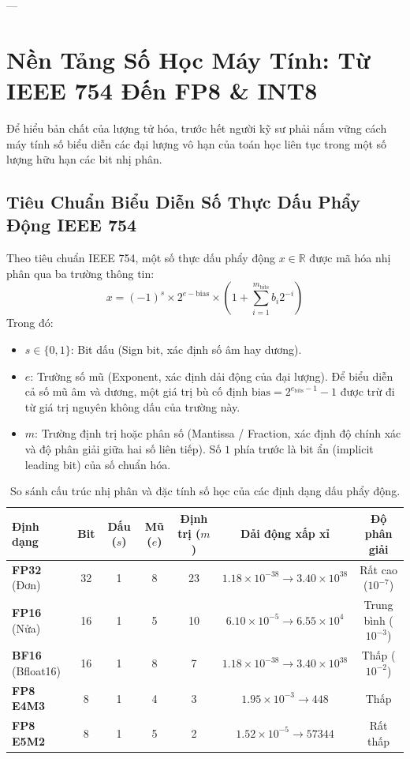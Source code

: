 ---

\section{Nền Tảng Số Học Máy Tính: Từ IEEE 754 Đến FP8 \& INT8}
\label{sec:computer-arithmetic-foundations}

Để hiểu bản chất của lượng tử hóa, trước hết người kỹ sư phải nắm vững cách máy tính số biểu diễn các đại lượng vô hạn của toán học liên tục trong một số lượng hữu hạn các bit nhị phân.

\subsection{Tiêu Chuẩn Biểu Diễn Số Thực Dấu Phẩy Động IEEE 754}
Theo tiêu chuẩn IEEE 754, một số thực dấu phẩy động $x \in \mathbb{R}$ được mã hóa nhị phân qua ba trường thông tin:
\begin{equation}
x = (-1)^s \times 2^{e - \text{bias}} \times \left(1 + \sum_{i=1}^{m_{\text{bits}}} b_i 2^{-i}\right)
\end{equation}
Trong đó:
\begin{itemize}
  \item $s \in \{0, 1\}$: Bit dấu (Sign bit, xác định số âm hay dương).
  \item $e$: Trường số mũ (Exponent, xác định dải động của đại lượng). Để biểu diễn cả số mũ âm và dương, một giá trị bù cố định $\text{bias} = 2^{e_{\text{bits}} - 1} - 1$ được trừ đi từ giá trị nguyên không dấu của trường này.
  \item $m$: Trường định trị hoặc phân số (Mantissa / Fraction, xác định độ chính xác và độ phân giải giữa hai số liên tiếp). Số $1$ phía trước là bit ẩn (implicit leading bit) của số chuẩn hóa.
\end{itemize}

\begin{table}[ht]
\centering
\footnotesize
\setlength{\tabcolsep}{3.5pt}
\caption{So sánh cấu trúc nhị phân và đặc tính số học của các định dạng dấu phẩy động.}
\label{tab:floating-point-formats}
\begin{tabular}{lcccccc}
\toprule
\textbf{Định dạng} & \textbf{Bit} & \textbf{Dấu ($s$)} & \textbf{Mũ ($e$)} & \textbf{Định trị ($m$)} & \textbf{Dải động xấp xỉ} & \textbf{Độ phân giải} \\
\midrule
\textbf{FP32} (Đơn)   & 32 & 1 & 8  & 23 & $1.18 \times 10^{-38} \to 3.40 \times 10^{38}$ & Rất cao ($10^{-7}$) \\
\textbf{FP16} (Nửa)   & 16 & 1 & 5  & 10 & $6.10 \times 10^{-5} \to 6.55 \times 10^{4}$  & Trung bình ($10^{-3}$) \\
\textbf{BF16} (Bfloat16)& 16 & 1 & 8  & 7  & $1.18 \times 10^{-38} \to 3.40 \times 10^{38}$ & Thấp ($10^{-2}$) \\
\textbf{FP8 E4M3}     & 8  & 1 & 4  & 3  & $1.95 \times 10^{-3} \to 448$                  & Thấp \\
\textbf{FP8 E5M2}     & 8  & 1 & 5  & 2  & $1.52 \times 10^{-5} \to 57344$                & Rất thấp \\
\bottomrule
\end{tabular}
\end{table}

